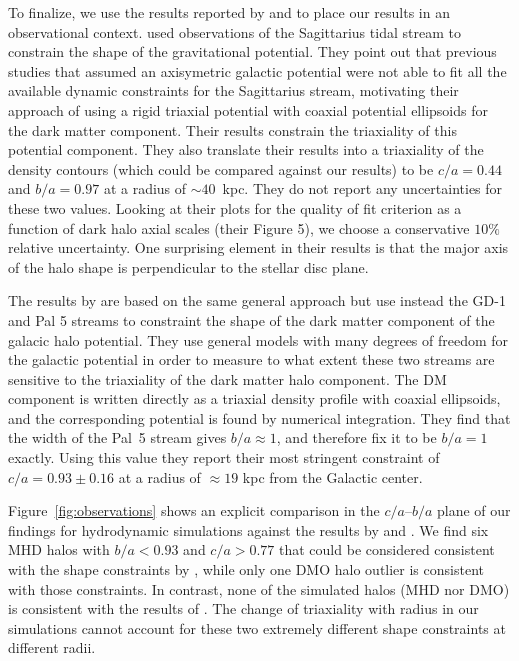 \documentclass[usenatbib]{mnras}
\begin{document}
To finalize, we use the results reported by \cite{LM10} and \cite{Bovy16}
to place our results in an observational context.
\cite{LM10} used observations of the Sagittarius tidal stream to
constrain the shape of the gravitational potential.
They point out that previous studies that assumed an
axisymetric galactic potential were not able to fit all the available
dynamic constraints for the Sagittarius stream, motivating 
their approach of using a rigid triaxial potential with coaxial potential
ellipsoids for the dark matter component.  
Their results constrain the triaxiality of this potential
component.  They also translate their results into a triaxiality of the density
contours (which could be compared against our results)
 to be $c/a=0.44$ and $b/a=0.97$ at a radius of $\sim 40$~kpc. 
They do not report any uncertainties for these two values. 
Looking at their plots for the quality of fit criterion as a function
of dark halo axial scales (their Figure 5), we choose a conservative $10\%$
relative uncertainty. One surprising element in their results is that 
the major axis of the
halo shape is perpendicular to the stellar disc plane.  

The results by \cite{Bovy16} are based on the same general approach but use
instead the GD-1 \citep{2006ApJ...641L..37G} and Pal 5 \citep{2009AJ....137.3378O}
streams to constraint the shape of the dark matter component of the
galacic halo potential. They use general models with many degrees of freedom for the galactic
potential in order to measure to what extent these two streams are sensitive
to the triaxiality of the dark matter halo component.
The DM component is written directly as a triaxial density profile
with coaxial ellipsoids, and the corresponding potential is found by
numerical integration. They find that the width of the Pal~5 stream gives $b/a\approx
1$, and therefore fix it to be $b/a=1$ exactly. Using this value they report their 
most stringent constraint of $c/a=0.93\pm0.16$ at a radius of $\approx 19$ kpc from the Galactic
center. 

Figure~\ref{fig:observations} shows an explicit comparison in
the $c/a$--$b/a$ plane of our findings for hydrodynamic simulations against the
results by \cite{LM10} and \cite{Bovy16}.
We find six MHD halos with $b/a<0.93$ and $c/a>0.77$ that could be
considered consistent with the shape constraints  by \citet{Bovy16}, while
only one DMO halo outlier  is consistent with those constraints.
In contrast, none of the simulated halos (MHD nor DMO) is consistent
with the results of \citet{LM10}. The change of triaxiality with radius in 
our simulations cannot account for these two extremely different 
shape constraints at different radii. 
\end{document}
